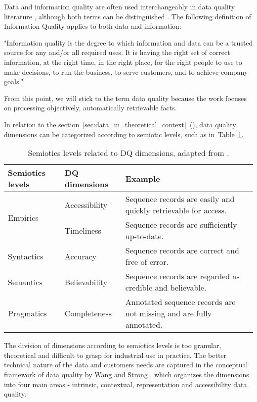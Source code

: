 			 Data and information quality are often used interchangeably in data quality literature \cite{Ehrlinger2019} \cite{McGilvray2008}, although both terms can be distinguished . The following definition of Information Quality applies to both data and information:
			
			"Information quality is the degree to which information and data can be a trusted source for any and/or all required uses. It is having the right set of correct information, at the right time, in the right place, for the right people to use to make decisions, to run the business, to serve customers, and to achieve company goals." \cite{McGilvray2008}
			
			From this point, we will stick to the term data quality because the work focuses on processing objectively, automatically retrievable facts. 
			
			In relation to the section~\ref{sec:data_in_theoretical_context}~(), data quality dimensions can be categorized according to semiotic levels, such as in~Table~\ref{tab:semiotic_levels_and_dims}. 

				\begin{table}[!h]
					\caption{Semiotics levels related to DQ dimensions, adapted from \cite{Huang2018}.}\label{tab:semiotic_levels_and_dims}
					\setlength{\extrarowheight}{8pt}
					\begin{tabularx}{\textwidth}{|X|X|X|}
\hline
\textbf{Semiotics levels} & \textbf{DQ dimensions} & \textbf{Example} \\ \hline \hline
\multirow{2}{*}{Empirics} & Accessibility & Sequence records are easily and quickly retrievable for access.     \\ \cline{2-3} 
                 & Timeliness    & Sequence records are sufficiently up-to-date.   \\ \hline
Syntactics       & Accuracy      & Sequence records are correct and free of error. \\ \hline
Semantics                 & Believability & Sequence records are regarded as credible and believable.           \\ \hline
Pragmatics                & Completeness  & Annotated sequence records are not missing and are fully annotated. \\ \hline
					\end{tabularx}
				\end{table}			
			
			The division of dimensions according to semiotics levels is too granular, theoretical and difficult to grasp for industrial use in practice. The better technical nature of the data and customers needs are captured in the conceptual framework of data quality by Wang and Strong \cite{Wang1996}, which organizes the dimensions into four main areas - intrinsic, contextual, representation and accessibility data quality.
			

